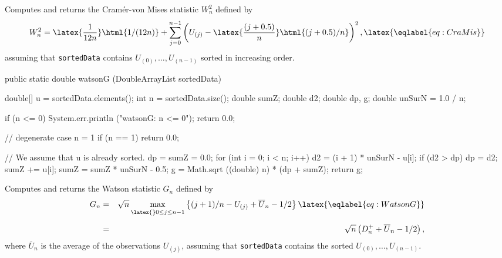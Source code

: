  \begin{tabb} Computes and returns the Cram\'er-von Mises statistic $W_n^2$
    defined by
  \begin {equation}
     W_n^2 = \latex{\frac{1}{ 12n}}\html{1/(12n)} +
            \sum_{j=0}^{n-1} \left (U_{(j)} - \latex{\frac{(j+0.5) }{ n}}\html{(j+0.5)/n}\right)^2,
                                                   \latex{\eqlabel {eq:CraMis}}
  \end {equation}
 assuming that \texttt{sortedData} contains $U_{(0)},\dots,U_{(n-1)}$
 sorted in increasing order.
 \end{tabb}
\begin{htmlonly}
\end{htmlonly}
\begin{code}

   public static double watsonG (DoubleArrayList sortedData)\begin{hide} {
      double[] u = sortedData.elements();
      int n = sortedData.size();
      double sumZ;
      double d2;
      double dp, g;
      double unSurN = 1.0 / n;

      if (n <= 0) {
         System.err.println ("watsonG: n <= 0");
         return 0.0;
      }

      // degenerate case n = 1
      if (n == 1)
         return 0.0;

      // We assume that u is already sorted.
      dp = sumZ = 0.0;
      for (int i = 0; i < n; i++) {
         d2 = (i + 1) * unSurN - u[i];
         if (d2 > dp)
            dp = d2;
         sumZ += u[i];
      }
      sumZ = sumZ * unSurN - 0.5;
      g = Math.sqrt ((double) n) * (dp + sumZ);
      return g;
   }\end{hide}
\end{code}
 \begin{tabb} Computes and returns the Watson statistic $G_n$
    defined by
 \begin {eqnarray}
  G_n &=& \sqrt{n} \max_{\latex{\rule{0pt}{7pt}} 0\le j \le n-1}
    \left\{ (j+1)/n -
         U_{(j)} + \overline{U}_n - 1/2 \right\}
                                            \latex{\eqlabel {eq:WatsonG}} \\[6pt]
    &=& \sqrt{n}\left (D_n^+ + \overline{U}_n  - 1/2\right), \nonumber
 \end {eqnarray}
  where $\overline{U}_n$ is the average of the observations $U_{(j)}$,
  assuming that \texttt{sortedData} contains the sorted $U_{(0)},\dots,U_{(n-1)}$.
 \end{tabb}
